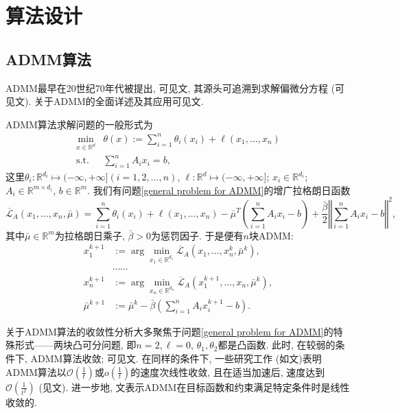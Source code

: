\documentclass[UTF8,10.5pt,a4paper]{ctexart}
\theoremstyle{definition}
\theoremstyle{definition}
\newcommand{\mcL}{\mathcal{L}}
\newcommand{\st}{\mathrm{s.t.}}
\begin{document}
\newpage
\section{算法设计}\label{algorithm}
\subsection{ADMM算法}
\par ADMM最早在20世纪70年代被提出, 可见文\cite{Glowinski1975Sur,Gabay1976A}, 其源头可追溯到求解偏微分方程 (可见文\cite{Boyd2011Distributed}). 关于ADMM的全面详述及其应用可见文\cite{Boyd2011Distributed}.
\par ADMM算法求解问题的一般形式为
\begin{equation}
	\begin{array}{rl}
	\min\limits_{x\in\mathbb{R}^d} & \theta(x):=\sum\limits_{i=1}^n\theta_i(x_i)+\ell(x_1,\ldots,x_n)\\
	\st & \sum\limits_{i=1}^nA_ix_i=b,
	\end{array}
	\label{general problem for ADMM}
\end{equation}
这里$\theta_i:\mathbb{R}^{d_i}\mapsto(-\infty,+\infty](i=1,2,\ldots,n)$, $\ell:\mathbb{R}^d\mapsto(-\infty,+\infty]$; $x_i\in\mathbb{R}^{d_i}$; $A_i\in\mathbb{R}^{m\times d_i}$, $b\in\mathbb{R}^m$. 我们有问题\eqref{general problem for ADMM}的增广拉格朗日函数
$$\overline{\mcL}_A(x_1,\ldots,x_n,\bar\mu)=\sum\limits_{i=1}^n\theta_i(x_i)+\ell(x_1,\ldots,x_n)-\bar\mu^T\left(\sum\limits_{i=1}^nA_ix_i-b\right)+\frac{\bar\beta}{2}\left\Vert\sum\limits_{i=1}^nA_ix_i-b\right\Vert^2,$$
其中$\bar\mu\in\mathbb{R}^m$为拉格朗日乘子, $\bar\beta>0$为惩罚因子. 于是便有$n$块ADMM:
$$\begin{aligned}
	x_1^{k+1}&:=\arg\min\limits_{x_1\in\mathbb{R}^{d_1}}\overline{\mcL}_A(x_1,\ldots,x_n^k,\bar\mu^k),\\
	&\cdots\cdots\\
	x_n^{k+1}&:=\arg\min\limits_{x_n\in\mathbb{R}^{d_n}}\overline{\mcL}_A(x_1^{k+1},\ldots,x_n,\bar\mu^k),\\
	\bar\mu^{k+1}&:=\bar\mu^k-\bar\beta\left(\sum\limits_{i=1}^nA_ix_i^{k+1}-b\right).
\end{aligned}$$
\par 关于ADMM算法的收敛性分析大多聚焦于问题\eqref{general problem for ADMM}的特殊形式——两块凸可分问题, 即$n=2,\ell=0$, $\theta_1,\theta_2$都是凸函数. 此时, 在较弱的条件下, ADMM算法收敛; 可见文\cite{Boyd2011Distributed}. 在同样的条件下, 一些研究工作 (如文\cite{He2012On,Monteiro2013Iteration,Davis2014COnvergence})表明ADMM算法以$\mathcal{O}(\frac{1}{t})$或$o(\frac{1}{t})$的速度次线性收敛, 且在适当加速后, 速度达到$\mathcal{O}(\frac{1}{t^2})$ (见文\cite{Goldstein2014Fast,Goldfarb2012Fast}). 进一步地, 文\cite{Deng2012On}表示ADMM在目标函数和约束满足特定条件时是线性收敛的.
\end{document}
